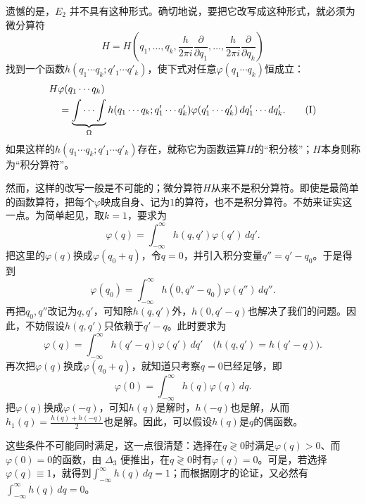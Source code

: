 \documentclass[fontsize=13pt,twoside,openany,headings=normal,parskip=false,bookmarkpackage=false,DIV=calc]{scrbook}
\begin{document}
遗憾的是，\hyperref[eq:I.3.E2]{$E_2$} 并不具有这种形式。确切地说，要把它改写成这种形式，就必须为微分算符
\[
 H=H\left(q_1,\ldots,q_k,\frac{h}{2\pi i}\frac{\partial}{\partial q_1},
 \ldots,\frac{h}{2\pi i}\frac{\partial}{\partial q_k}\right)
\]
找到一个函数$h(q_1\cdots q_k;q'_1\cdots q'_k)$，使下式对任意$\varphi(q_1\cdots q_k)$恒成立：
\begin{align}
 &H\varphi(q_1\cdots q_k)\notag\\
 &\quad=\underbrace{\int\cdots\int}_{\Omega} h(q_1\cdots q_k;q'_1\cdots q'_k)
 \varphi(q'_1\cdots q'_k)\,dq'_1\cdots dq'_k.
 \tag{I}\label{eq:I.3.I}
\end{align}
如果这样的$h(q_1\cdots q_k;q'_1\cdots q'_k)$存在，就称它为函数运算$H$的“积分核”；$H$本身则称为“积分算符”。

然而，这样的改写一般是不可能的；微分算符$H$从来不是积分算符。即使是最简单的函数算符，把每个$\varphi$映成自身、记为$1$的算符，也不是积分算符。不妨来证实这一点。为简单起见，取$k=1$，要求为
\begin{equation}
 \varphi(q)=\int_{-\infty}^{\infty}h(q,q')\varphi(q')\,dq'.
 \tag{$\Delta_1$}\label{eq:I.3.D1}
\end{equation}
把这里的$\varphi(q)$换成$\varphi(q_0+q)$，令$q=0$，并引入积分变量$q''=q'-q_0$。于是得到
\[
 \varphi(q_0)=\int_{-\infty}^{\infty}h(0,q''-q_0)\varphi(q'')\,dq''.
\]
再把$q_0,\allowbreak q''$改记为$q,\allowbreak q'$，可知除$h(q,\allowbreak q')$外，$h(0,\allowbreak q'-q)$也解决了我们的问题。因此，不妨假设$h(q,\allowbreak q')$只依赖于$q'-q$。此时要求为
\begin{equation}
 \varphi(q)=\int_{-\infty}^{\infty}h(q'-q)\varphi(q')\,dq'
 \quad\bigl(h(q,q')=h(q'-q)\bigr).
 \tag{$\Delta_2$}\label{eq:I.3.D2}
\end{equation}
再次把$\varphi(q)$换成$\varphi(q_0+q)$，就知道只考察$q=0$已经足够，即
\begin{equation}
 \varphi(0)=\int_{-\infty}^{\infty}h(q)\varphi(q)\,dq.
 \tag{$\Delta_3$}\label{eq:I.3.D3}
\end{equation}
把$\varphi(q)$换成$\varphi(-q)$，可知$h(q)$是解时，$h(-q)$也是解，从而$h_1(q)=\frac{h(q)+h(-q)}2$也是解。因此，可以假设$h(q)$是$q$的偶函数。

这些条件不可能同时满足，这一点很清楚：选择在$q\gtrless0$时满足$\varphi(q)>0$、而$\varphi(0)=0$的函数，由 \hyperref[eq:I.3.D3]{$\Delta_3$} 便推出，在$q\gtrless0$时有$\varphi(q)=0$。\hypertarget{origpage-14}{}\label{origpage-14}可是，若选择$\varphi(q)\equiv1$，就得到$\int_{-\infty}^{\infty}h(q)\,dq=1$；而根据刚才的论证，又必然有$\int_{-\infty}^{\infty}h(q)\,dq=0$。
\end{document}
